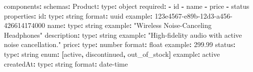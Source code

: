 \documentclass[
  11pt,
  openany,
  oneside]{book}
\newenvironment{Shaded}{}{}
\newcommand{\AttributeTok}[1]{\textcolor[rgb]{0.49,0.56,0.16}{#1}}
\newcommand{\FloatTok}[1]{\textcolor[rgb]{0.25,0.63,0.44}{#1}}
\newcommand{\FunctionTok}[1]{\textcolor[rgb]{0.02,0.16,0.49}{#1}}
\newcommand{\KeywordTok}[1]{\textcolor[rgb]{0.00,0.44,0.13}{\textbf{#1}}}
\newcommand{\StringTok}[1]{\textcolor[rgb]{0.25,0.44,0.63}{#1}}
\begin{document}
\begin{Shaded}
\begin{Highlighting}[]
\FunctionTok{components}\KeywordTok{:}
\AttributeTok{  }\FunctionTok{schemas}\KeywordTok{:}
\AttributeTok{    }\FunctionTok{Product}\KeywordTok{:}
\AttributeTok{      }\FunctionTok{type}\KeywordTok{:}\AttributeTok{ object}
\AttributeTok{      }\FunctionTok{required}\KeywordTok{:}
\AttributeTok{        }\KeywordTok{{-}}\AttributeTok{ id}
\AttributeTok{        }\KeywordTok{{-}}\AttributeTok{ name}
\AttributeTok{        }\KeywordTok{{-}}\AttributeTok{ price}
\AttributeTok{        }\KeywordTok{{-}}\AttributeTok{ status}
\AttributeTok{      }\FunctionTok{properties}\KeywordTok{:}
\AttributeTok{        }\FunctionTok{id}\KeywordTok{:}
\AttributeTok{          }\FunctionTok{type}\KeywordTok{:}\AttributeTok{ string}
\AttributeTok{          }\FunctionTok{format}\KeywordTok{:}\AttributeTok{ uuid}
\AttributeTok{          }\FunctionTok{example}\KeywordTok{:}\AttributeTok{ 123e4567{-}e89b{-}12d3{-}a456{-}426614174000}
\AttributeTok{        }\FunctionTok{name}\KeywordTok{:}
\AttributeTok{          }\FunctionTok{type}\KeywordTok{:}\AttributeTok{ string}
\AttributeTok{          }\FunctionTok{example}\KeywordTok{:}\AttributeTok{ }\StringTok{"Wireless Noise{-}Canceling Headphones"}
\AttributeTok{        }\FunctionTok{description}\KeywordTok{:}
\AttributeTok{          }\FunctionTok{type}\KeywordTok{:}\AttributeTok{ string}
\AttributeTok{          }\FunctionTok{example}\KeywordTok{:}\AttributeTok{ }\StringTok{"High{-}fidelity audio with active noise cancellation."}
\AttributeTok{        }\FunctionTok{price}\KeywordTok{:}
\AttributeTok{          }\FunctionTok{type}\KeywordTok{:}\AttributeTok{ number}
\AttributeTok{          }\FunctionTok{format}\KeywordTok{:}\AttributeTok{ float}
\AttributeTok{          }\FunctionTok{example}\KeywordTok{:}\AttributeTok{ }\FloatTok{299.99}
\AttributeTok{        }\FunctionTok{status}\KeywordTok{:}
\AttributeTok{          }\FunctionTok{type}\KeywordTok{:}\AttributeTok{ string}
\AttributeTok{          }\FunctionTok{enum}\KeywordTok{:}\AttributeTok{ }\KeywordTok{[}\AttributeTok{active}\KeywordTok{,}\AttributeTok{ discontinued}\KeywordTok{,}\AttributeTok{ out\_of\_stock}\KeywordTok{]}
\AttributeTok{          }\FunctionTok{example}\KeywordTok{:}\AttributeTok{ active}
\AttributeTok{        }\FunctionTok{createdAt}\KeywordTok{:}
\AttributeTok{          }\FunctionTok{type}\KeywordTok{:}\AttributeTok{ string}
\AttributeTok{          }\FunctionTok{format}\KeywordTok{:}\AttributeTok{ date{-}time}


\end{Highlighting}
\end{Shaded}
\end{document}
